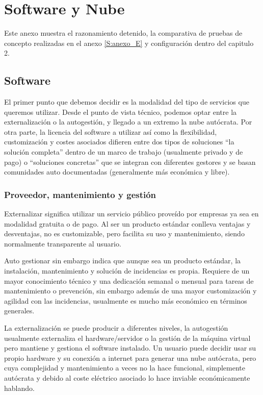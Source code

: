 \chapter{Software y Nube}\label{S:anexo_C}
Este anexo muestra el razonamiento detenido, la comparativa de pruebas de concepto realizadas en el anexo \ref{S:anexo_E} y configuración dentro del capitulo 2.

\section{Software}\label{S:decisiones_software}
El primer punto que debemos decidir\cite{c_inhouse_outsource} es la modalidad del tipo de servicios que queremos utilizar. Desde el punto de vista técnico, podemos optar entre la externalización o la autogestión, y llegado a un extremo la nube autócrata. Por otra parte, la licencia del software a utilizar así como la flexibilidad, customización y costes asociados difieren entre dos tipos de soluciones “la solución completa” dentro de un marco de trabajo (usualmente privado y de pago) o “soluciones concretas” que se integran con diferentes gestores y se basan comunidades auto documentadas (generalmente más económica y libre). 

\subsection{Proveedor, mantenimiento y gestión}
Externalizar significa utilizar un servicio público proveído por empresas ya sea en modalidad gratuita o de pago. Al ser un producto estándar conlleva ventajas y desventajas, no es customizable, pero facilita su uso y mantenimiento, siendo normalmente transparente al usuario. 

Auto gestionar sin embargo indica que aunque sea un producto estándar, la instalación, mantenimiento y solución de incidencias es propia. Requiere de un mayor conocimiento técnico y una dedicación semanal o mensual para tareas de mantenimiento o prevención, sin embargo además de una mayor customización y agilidad con las incidencias, usualmente es mucho más económico en términos generales.

La externalización se puede producir a diferentes niveles, la autogestión usualmente externaliza el hardware/servidor o la gestión de la máquina virtual pero mantiene y gestiona el software instalado. Un usuario puede decidir usar su propio hardware y su conexión a internet para generar una nube autócrata, pero cuya complejidad y mantenimiento a veces no la hace funcional, simplemente autócrata y debido al coste eléctrico asociado lo hace inviable económicamente hablando.


